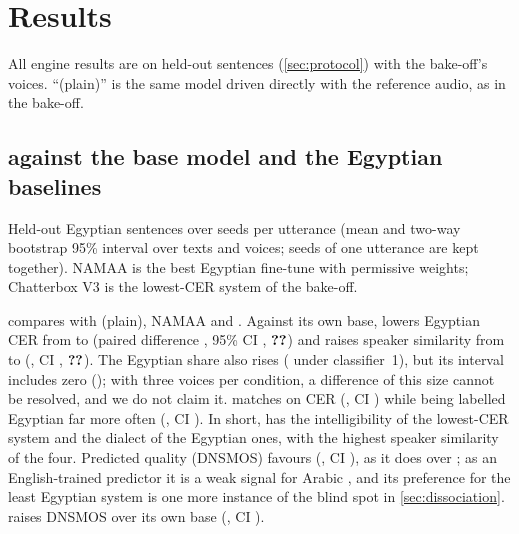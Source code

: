 \section{Results}\label{sec:results}

All engine results are on held-out sentences (\cref{sec:protocol}) with the bake-off's voices. ``\vox (plain)'' is
the same model driven directly with the reference audio, as in the bake-off.

\subsection{\BA against the base model and the Egyptian baselines}

\begin{table}[t]
\centering\small
\caption{Held-out Egyptian sentences over  seeds per utterance (mean and two-way bootstrap 95\% interval over
texts and voices; seeds of one utterance are kept together). NAMAA is the best Egyptian fine-tune with permissive
weights; Chatterbox V3 is the lowest-CER system of the bake-off.}
\label{tab:seeds}
\begin{adjustbox}{max width=\linewidth}
\end{adjustbox}
\end{table}

 compares \BA with \vox (plain), NAMAA and \cbthree. Against its own base, \BA lowers Egyptian CER
from  to 
(paired difference , 95\% CI ,
$\R{pt:ba_minus_voxcpm2:egy_main:cer_best:pholm}$) and raises speaker similarity from
 to 
(, CI ,
$\R{pt:ba_minus_voxcpm2:egy_main:sim_ecapa:pholm}$). The Egyptian share also rises
( under classifier~1), but its interval includes zero
(); with three voices per condition, a difference of this size cannot be
resolved, and we do not claim it. \BA matches \cbthree on CER
(, CI ) while being labelled
Egyptian far more often (, CI ). In short,
\BA has the intelligibility of the lowest-CER system and the dialect of the Egyptian ones, with the highest speaker
similarity of the four. Predicted quality (DNSMOS) favours \cbthree
(, CI ), as it does over \vox;
as an English-trained predictor it is a weak signal for Arabic \citep{kunesova2024zeroshotmos}, and its preference for
the least Egyptian system is one more instance of the blind spot in \cref{sec:dissociation}. \BA raises DNSMOS over
its own base (, CI ).

